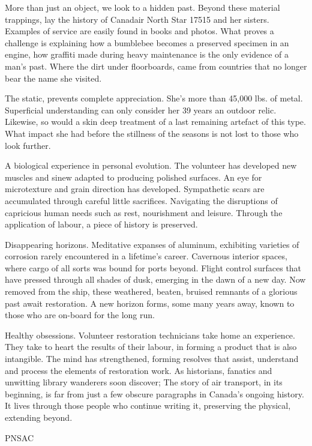 More than just an object, we look to a hidden past. Beyond these material
trappings, lay the history of Canadair North Star 17515 and her sisters.
Examples of service are easily found in books and photos. What proves a
challenge is explaining how a bumblebee becomes a preserved specimen in an
engine, how graffiti made during heavy maintenance is the only evidence of a
man's past. Where the dirt under floorboards, came from countries that no
longer bear the name she visited.

The static, prevents complete appreciation. She's more than 45,000 lbs. of
metal. Superficial understanding can only consider her 39 years an outdoor
relic. Likewise, so would a skin deep treatment of a last remaining artefact of
this type. What impact she had before the stillness of the seasons is not lost
to those who look further.

A biological experience in personal evolution. The volunteer has developed new
muscles and sinew adapted to producing polished surfaces. An eye for
microtexture and grain direction has developed. Sympathetic scars are
accumulated through careful little sacrifices. Navigating the disruptions of
capricious human needs such as rest, nourishment and leisure. Through the
application of labour, a piece of history is preserved.

Disappearing horizons. Meditative expanses of aluminum, exhibiting varieties of
corrosion rarely encountered in a lifetime's career. Cavernous interior spaces,
where cargo of all sorts was bound for ports beyond. Flight control surfaces
that have pressed through all shades of dusk, emerging in the dawn of a new
day. Now removed from the ship, these weathered, beaten, bruised remnants of a
glorious past await restoration. A new horizon forms, some many years away,
known to those who are on-board for the long run.

Healthy obsessions. Volunteer restoration technicians take home an experience.
They take to heart the results of their labour, in forming a product that is
also intangible. The mind has strengthened, forming resolves that assist,
understand and process the elements of restoration work. As historians,
fanatics and unwitting library wanderers soon discover; The story of air
transport, in its beginning, is far from just a few obscure paragraphs in
Canada's ongoing history. It lives through those people who continue writing
it, preserving the physical, extending beyond.


\begin{footnotesize}
  \raggedleft PNSAC\\
\end{footnotesize}



